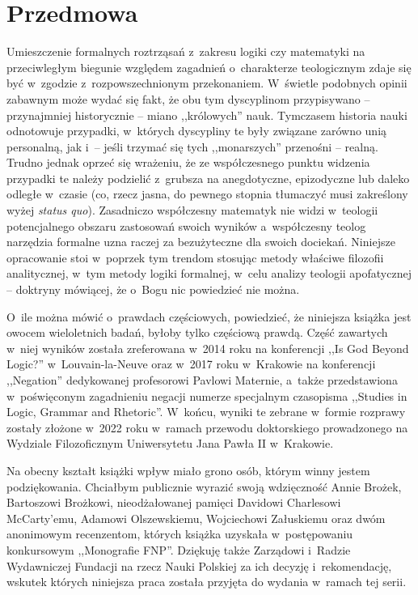 \chapter*{Przedmowa}


Umieszczenie formalnych roztrząsań z~zakresu logiki czy matematyki na przeciwległym biegunie względem zagadnień o~charakterze teologicznym zdaje się być w~zgodzie z~rozpowszechnionym przekonaniem. W~świetle podobnych opinii %
zabawnym może wydać się fakt, że obu tym dyscyplinom przypisywano -- przynajmniej historycznie -- miano ,,królowych'' nauk. Tymczasem historia nauki odnotowuje przypadki, w~których dyscypliny te były związane zarówno unią personalną, jak i~-- jeśli trzymać się tych ,,monarszych'' przenośni -- realną. Trudno jednak oprzeć się wrażeniu, że ze współczesnego punktu widzenia przypadki te należy podzielić z~grubsza na anegdotyczne, epizodyczne lub daleko odległe w~czasie (co, rzecz jasna, do pewnego stopnia tłumaczyć musi zakreślony wyżej \textit{status quo}). Zasadniczo współczesny matematyk nie widzi w~teologii potencjalnego obszaru zastosowań swoich wyników a~współczesny teolog narzędzia formalne uzna raczej za bezużyteczne dla swoich dociekań. Niniejsze opracowanie stoi w~poprzek tym trendom stosując metody właściwe filozofii analitycznej, w~tym metody logiki formalnej, w~celu analizy teologii apofatycznej -- doktryny mówiącej, że o~Bogu nic powiedzieć nie można.

O~ile można mówić o~prawdach częściowych, powiedzieć, że niniejsza książka jest owocem wieloletnich badań, byłoby tylko częściową prawdą. Część zawartych w~niej wyników została zreferowana w~2014 roku na konferencji ,,Is God Beyond Logic?'' w~Louvain-la-Neuve
oraz w~2017 roku w~Krakowie na konferencji ,,Negation'' dedykowanej profesorowi Pavlowi Maternie, a~także przedstawiona w~poświęconym zagadnieniu negacji numerze specjalnym czasopisma ,,Studies in Logic, Grammar and Rhetoric''. W~końcu, wyniki te zebrane w~formie rozprawy zostały złożone w~2022 roku w~ramach przewodu doktorskiego prowadzonego na Wydziale Filozoficznym Uniwersytetu Jana Pawła II w~Krakowie.

Na obecny kształt książki wpływ miało grono osób, którym winny jestem podziękowania. Chciałbym publicznie wyrazić swoją wdzięczność Annie Brożek, Bartoszowi Brożkowi, nieodżałowanej pamięci Davidowi Charlesowi McCarty'emu, Adamowi Olszewskiemu, Wojciechowi Załuskiemu oraz dwóm anonimowym recenzentom, których książka uzyskała w~postępowaniu konkursowym ,,Monografie FNP''. Dziękuję także Zarządowi i~Radzie Wydawniczej Fundacji na rzecz Nauki Polskiej za ich decyzję i~rekomendację, wskutek których niniejsza praca została przyjęta do wydania w~ramach tej serii.

